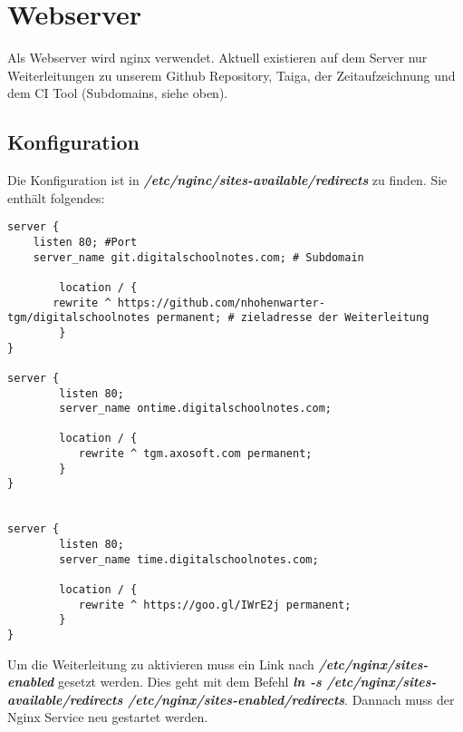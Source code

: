 \documentclass[12pt,a4paper,oneside,ngerman]{scrartcl}
\begin{document}
\section{Webserver}
Als Webserver wird nginx verwendet. Aktuell existieren auf dem Server nur Weiterleitungen zu unserem Github Repository, Taiga, der Zeitaufzeichnung und dem CI Tool (Subdomains, siehe oben).

\subsection{Konfiguration}
Die Konfiguration ist in \textbf{\textit{/etc/nginc/sites-available/redirects}} zu finden. Sie enthält folgendes:

\begin{lstlisting}
server {
	listen 80; #Port
	server_name git.digitalschoolnotes.com; # Subdomain

    	location / {
	   rewrite ^ https://github.com/nhohenwarter-tgm/digitalschoolnotes permanent; # zieladresse der Weiterleitung
    	}
}

server {
        listen 80;
        server_name ontime.digitalschoolnotes.com;

        location / {
           rewrite ^ tgm.axosoft.com permanent;
        }
}


server {
        listen 80;
        server_name time.digitalschoolnotes.com;

        location / {
           rewrite ^ https://goo.gl/IWrE2j permanent;
        }
}

\end{lstlisting}

Um die Weiterleitung zu aktivieren muss ein Link nach \textbf{\textit{/etc/nginx/sites-enabled}} gesetzt werden. Dies geht mit dem Befehl \textbf{\textit{ln -s /etc/nginx/sites-available/redirects /etc/nginx/sites-enabled/redirects}}. Dannach muss der Nginx Service neu gestartet werden.

 



\end{document}
